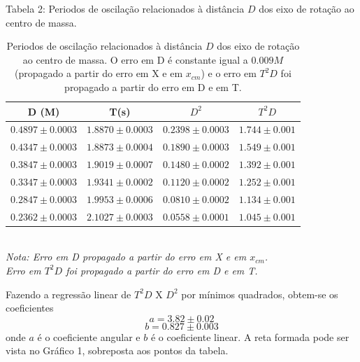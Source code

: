 \documentclass[12pt,a4paper]{article}
\begin{document}
  
\begin{table}[!htbp]
\caption{Periodos de oscilação relacionados à distância $D$ dos eixo de rotação ao centro de massa. O erro em D é constante igual a $0.009 M$ (propagado a partir do erro em X e em $x_{cm}$) e o erro em $T^2D$ foi propagado a partir do erro em D e em T.}
\def\arraystretch{1.5}

{Tabela 2: Periodos de oscilação relacionados à distância $D$ dos eixo de rotação ao centro de massa.}\\[10pt]

\begin{tabular}{|c|c|c|c|}
\hline
D (M)& T(s) & $D^2$ & $T^2D$ \\
\hline
$0.4897\pm0.0003$ & $1.8870 \pm 0.0003$ & $0.2398\pm0.0003$ & $1.744 \pm 0.001$\\
\hline
$0.4347\pm0.0003$ & $1.8873 \pm 0.0004$ & $0.1890\pm0.0003$ & $1.549 \pm 0.001$\\
\hline
$0.3847\pm0.0003$ & $1.9019 \pm 0.0007$ & $0.1480\pm0.0002$ & $1.392 \pm 0.001$\\
\hline
$0.3347\pm0.0003$ & $1.9341 \pm 0.0002$ & $0.1120\pm0.0002$ & $1.252 \pm 0.001$\\
\hline
$0.2847\pm0.0003$ & $1.9953 \pm 0.0006$ & $0.0810\pm0.0002$ & $1.134 \pm 0.001$\\
\hline
$0.2362\pm0.0003$ & $2.1027 \pm 0.0003$ & $0.0558\pm0.0001$ & $1.045 \pm 0.001$\\
\hline
\end{tabular}
\\
\emph {Nota: Erro em D propagado a partir do erro em X e em $x_{cm}$.\\
			Erro em $T^2D$ foi propagado a partir do erro em D e em T.\\}
\end{table}

Fazendo a regressão linear de $T^2D$ X $D^2$ por mínimos quadrados, obtem-se os coeficientes 
$$ a = 3.82 \pm 0.02 $$ 
 $$ b = 0.827 \pm 0.003 $$
onde $a$ é o coeficiente angular e $b$ é o coeficiente linear. A reta formada pode ser vista no Gráfico 1, sobreposta aos pontos da tabela.
\end{document}
